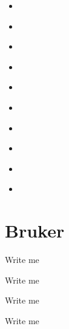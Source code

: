 \documentclass[letterpaper,10pt,english]{sphinxmanual}
\begin{document}
\label{\detokenize{Sub-Packages:overview}}\label{\detokenize{Sub-Packages::doc}}\begin{itemize}
\item {} 
\sphinxAtStartPar
{\hyperref[\detokenize{Sub-Packages:bruker-module}]{}}

\item {} 
\sphinxAtStartPar
{\hyperref[\detokenize{Sub-Packages:coloring-module}]{}}

\item {} 
\sphinxAtStartPar
{\hyperref[\detokenize{Sub-Packages:event-processing-module}]{}}

\item {} 
\sphinxAtStartPar
{\hyperref[\detokenize{Sub-Packages:io-module}]{}}

\item {} 
\sphinxAtStartPar
{\hyperref[\detokenize{Sub-Packages:image-processing-module}]{}}

\item {} 
\sphinxAtStartPar
{\hyperref[\detokenize{Sub-Packages:interactive-visuals-module}]{}}

\item {} 
\sphinxAtStartPar
{\hyperref[\detokenize{Sub-Packages:miscellaneous-module}]{}}

\item {} 
\sphinxAtStartPar
{\hyperref[\detokenize{Sub-Packages:reorganization-module}]{}}

\item {} 
\sphinxAtStartPar
{\hyperref[\detokenize{Sub-Packages:trace-processing-module}]{}}

\item {} 
\sphinxAtStartPar
{\hyperref[\detokenize{Sub-Packages:version-module}]{}}

\end{itemize}


\section{Bruker}
\label{\detokenize{Sub-Packages:bruker}}\label{\detokenize{Sub-Packages:bruker-module}}
\begin{DUlineblock}{0em}
\item[] Write me
\item[] Write me
\item[] Write me
\item[] Write me
\end{DUlineblock}
\end{document}
